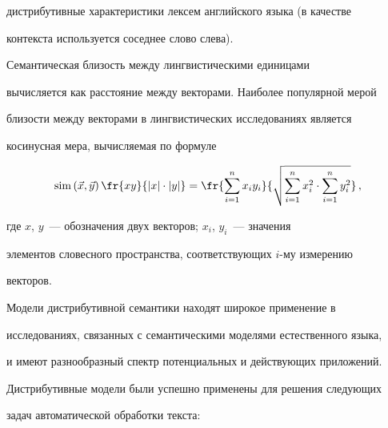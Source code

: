 дистрибутивные характеристики лексем английского языка (в качестве


контекста используется соседнее слово слева).








     Семантическая близость между лингвистическими единицами


вычисляется как расстояние между векторами. Наиболее популярной мерой


близости между векторами в лингвистических исследованиях является


косинусная мера, вы\-чис\-ля\-емая по формуле


     $$


     \mathrm{sim} \left( \vec{x},\vec{y}\right) \fr{x y}{\vert x\vert \cdot \vert


y\vert}=  \fr{\sum_{i=1}^n x_i y_i}{\sqrt{\sum_{i=1}^n x_i^2 \cdot


\sum^n_{i=1} y_i^2}}\,,


     $$


где $x$, $y$~--- обозначения двух векторов; $x_i$, $y_i$~--- значения


элементов словесного пространства, соответствующих $i$-му измерению


векторов.





     Модели дистрибутивной семантики находят широкое применение в


исследованиях, связанных с семантическими моделями естественного языка,


и имеют разнообразный спектр потенциальных и действующих приложений.


Дистрибутивные модели были успешно применены для решения следующих


задач автоматической обработки текста:


